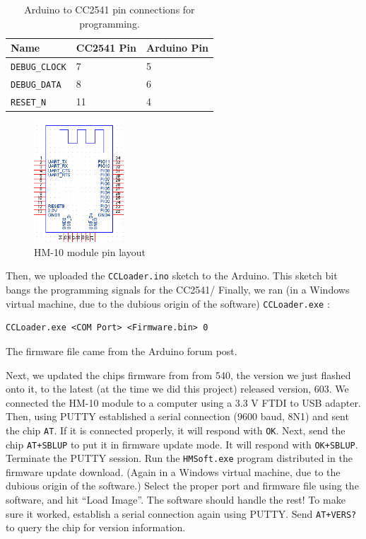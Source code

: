 \documentclass[]{article}
\begin{document}
\begin{table}[]
  \centering
  \begin{tabular}{@{}lll@{}}
    \toprule
    Name & CC2541 Pin & Arduino Pin\tabularnewline
    \midrule
    \texttt{DEBUG\_CLOCK} & 7 & 5\tabularnewline
    \texttt{DEBUG\_DATA} & 8 & 6\tabularnewline
    \texttt{RESET\_N} & 11 & 4\tabularnewline
    \bottomrule
  \end{tabular}
  \caption{Arduino to CC2541 pin connections for programming.}
  \label{table:progpins}
\end{table}

\begin{figure}
  \centering
  \includegraphics[width=0.3\textwidth]{hm10_pins.png}
  \caption{HM-10 module pin layout \cite{crystal}}
  \label{fig:hm10}
\end{figure}

Then, we uploaded the \texttt{CCLoader.ino} \cite{ccloader} sketch to the Arduino.
This sketch bit bangs the programming signals for the CC2541/
Finally, we ran (in a Windows virtual machine, due to the dubious origin of the software) \texttt{CCLoader.exe} \cite{ccloaderexe}:
\begin{Verbatim}[gobble=2]
  CCLoader.exe <COM Port> <Firmware.bin> 0
\end{Verbatim}
The firmware file came from the Arduino forum post. \cite{firmwarefile}

Next, we updated the chips firmware from from 540, the version we just flashed onto it, to the latest (at the time we did this project) released version, 603. \cite{jnhuamao603}
We connected the HM-10 module to a computer using a 3.3 V FTDI to USB adapter.
Then, using PUTTY established a serial connection (9600 baud, 8N1) and sent the chip \texttt{AT}. If it is connected properly, it will respond with \texttt{OK}.
Next, send the chip \texttt{AT+SBLUP} to put it in firmware update mode.
It will respond with \texttt{OK+SBLUP}. Terminate the PUTTY session.
Run the \texttt{HMSoft.exe} program distributed in the firmware update download.
(Again in a Windows virtual machine, due to the dubious origin of the software.)
Select the proper port and firmware file using the software, and hit ``Load Image''.
The software should handle the rest!
To make sure it worked, establish a serial connection again using PUTTY.
Send \texttt{AT+VERS?} to query the chip for version information.
\end{document}
